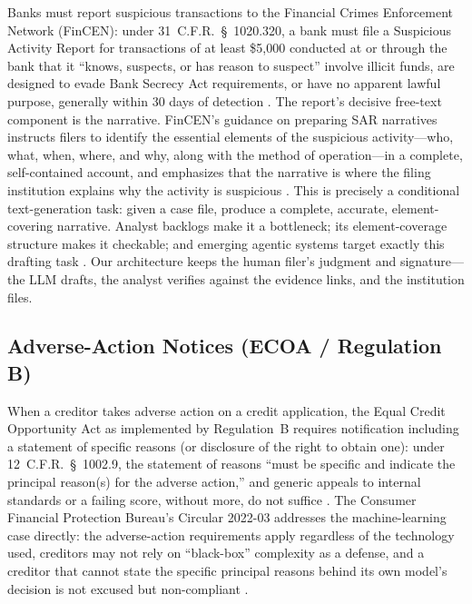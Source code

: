 \documentclass{article}
\begin{document}
Banks must report suspicious transactions to the Financial Crimes Enforcement
Network (FinCEN): under 31~C.F.R.~\S~1020.320, a bank must file a Suspicious
Activity Report for transactions of at least \$5{,}000 conducted at or through
the bank that it ``knows, suspects, or has reason to suspect'' involve illicit
funds, are designed to evade Bank Secrecy Act requirements, or have no
apparent lawful purpose, generally within 30 days of detection
\citep{cfr1020_320}. The report's decisive free-text component is the
narrative. FinCEN's guidance on preparing SAR narratives instructs filers to
identify the essential elements of the suspicious activity---who, what, when,
where, and why, along with the method of operation---in a complete,
self-contained account, and emphasizes that the narrative is where the filing
institution explains why the activity is suspicious
\citep{fincen2003sarnarrative}. This is precisely a conditional
text-generation task: given a case file, produce a complete, accurate,
element-covering narrative. Analyst backlogs make it a bottleneck; its
element-coverage structure makes it checkable; and emerging agentic systems
target exactly this drafting task \citep{naik2025coinvestigator}. Our
architecture keeps the human filer's judgment and signature---the LLM drafts,
the analyst verifies against the evidence links, and the institution files.

\subsection{Adverse-Action Notices (ECOA / Regulation B)}
\label{sec:p8-adverse}

When a creditor takes adverse action on a credit application, the Equal Credit
Opportunity Act as implemented by Regulation~B requires notification including
a statement of specific reasons (or disclosure of the right to obtain one):
under 12~C.F.R.~\S~1002.9, the statement of reasons ``must be specific and
indicate the principal reason(s) for the adverse action,'' and generic appeals
to internal standards or a failing score, without more, do not suffice
\citep{cfr1002_9}. The Consumer Financial Protection Bureau's Circular
2022-03 addresses the machine-learning case directly: the adverse-action
requirements apply regardless of the technology used, creditors may not rely
on ``black-box'' complexity as a defense, and a creditor that cannot state the
specific principal reasons behind its own model's decision is not excused but
non-compliant \citep{cfpb2022circular}.
\end{document}
